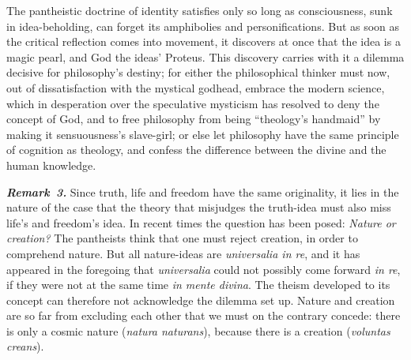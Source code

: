 \documentclass[12pt]{book}
\newcommand{\anm}[1]{\emph{\textbf{Remark~#1.}}}
\begin{document}
The pantheistic doctrine of identity satisfies only so long as
consciousness, sunk in idea-beholding, can forget its amphibolies and
personifications. But as soon as the critical reflection comes into
movement, it discovers at once that the idea is a magic pearl, and God the
ideas' Proteus. This discovery carries with it a dilemma decisive for
philosophy's destiny; for either the philosophical thinker must now, out of
dissatisfaction with the mystical godhead, embrace the modern science, which
in desperation over the speculative mysticism has resolved to deny the
concept of God, and to free philosophy from being ``theology's handmaid''
by making it sensuousness's slave-girl; or else let philosophy have the same
principle of cognition as theology, and confess the difference between the
divine and the human knowledge.

\anm{3} Since truth, life and freedom have the same originality, it lies in
the nature of the case that the theory that misjudges the truth-idea must
also miss life's and freedom's idea. In recent times the question has been
posed: \emph{Nature or creation?} The pantheists think that one must reject
creation, in order to comprehend nature. But all nature-ideas are
\textit{universalia in re}, and it has appeared in the foregoing that
\textit{universalia} could not possibly come forward \textit{in re}, if they
were not at the same time \textit{in mente divina}. The theism developed to
its concept can therefore not acknowledge the dilemma set up. Nature and
creation are so far from excluding each other that we must on the contrary
concede: there is only a cosmic nature (\textit{natura naturans}), because
there is a creation (\textit{voluntas creans}).
\end{document}
